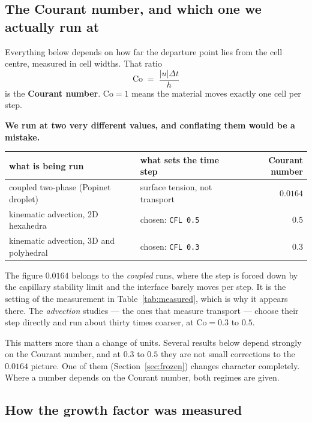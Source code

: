 \documentclass[11pt,a4paper]{article}
\begin{document}
\subsection{The Courant number, and which one we actually run at}
\label{sec:courant}

Everything below depends on how far the departure point lies from the cell centre, measured in
cell widths. That ratio
\begin{equation}
  \mathrm{Co} \;=\; \frac{|u| \Delta t}{h}
\end{equation}
is the \textbf{Courant number}. $\mathrm{Co} = 1$ means the material moves exactly one cell per
step.

\textbf{We run at two very different values, and conflating them would be a mistake.}

\begin{center}
\begin{tabular}{llr}
\toprule
what is being run & what sets the time step & Courant number \\
\midrule
coupled two-phase (Popinet droplet)    & surface tension, not transport & $0.0164$ \\
kinematic advection, 2D hexahedra      & chosen: \texttt{CFL 0.5}       & $0.5$ \\
kinematic advection, 3D and polyhedral & chosen: \texttt{CFL 0.3}       & $0.3$ \\
\bottomrule
\end{tabular}
\end{center}

The figure $0.0164$ belongs to the \emph{coupled} runs, where the step is forced down by the
capillary stability limit and the interface barely moves per step. It is the setting of the
measurement in Table~\ref{tab:measured}, which is why it appears there. The \emph{advection}
studies --- the ones that measure transport --- choose their step directly and run about thirty
times coarser, at $\mathrm{Co} = 0.3$ to $0.5$.

This matters more than a change of units. Several results below depend strongly on the Courant
number, and at $0.3$ to $0.5$ they are not small corrections to the $0.0164$ picture. One of
them (Section~\ref{sec:frozen}) changes character completely. Where a number depends on the
Courant number, both regimes are given.

\subsection{How the growth factor was measured}
\label{sec:poweriter}
\end{document}
